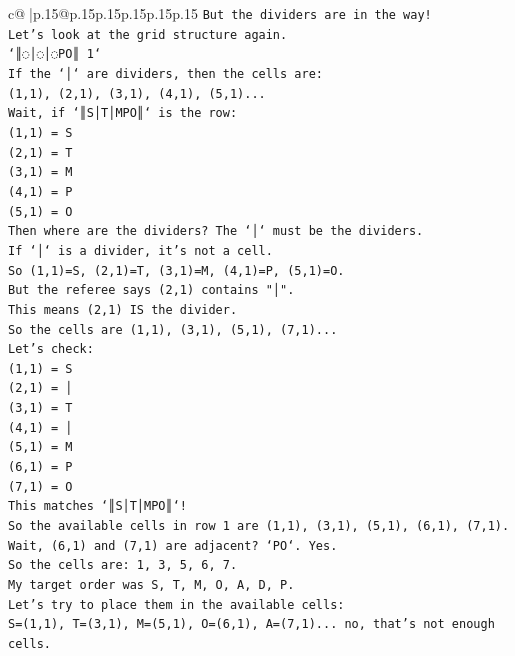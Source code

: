 \documentclass{article}
\begin{document}
{\begin{supertabular}{c@{$\;$}|p{.15\linewidth}@{}p{.15\linewidth}p{.15\linewidth}p{.15\linewidth}p{.15\linewidth}p{.15\linewidth}}
{{{\texttt{But the dividers are in the way!} \\
\texttt{Let's look at the grid structure again.} \\
\texttt{`║◌│◌│◌PO║ 1`} \\
\texttt{If the `│` are dividers, then the cells are:} \\
\texttt{(1,1), (2,1), (3,1), (4,1), (5,1)...} \\
\texttt{Wait, if `║S│T│MPO║` is the row:} \\
\texttt{(1,1) = S} \\
\texttt{(2,1) = T} \\
\texttt{(3,1) = M} \\
\texttt{(4,1) = P} \\
\texttt{(5,1) = O} \\
\texttt{Then where are the dividers? The `│` must be the dividers.} \\
\texttt{If `│` is a divider, it's not a cell.} \\
\texttt{So (1,1)=S, (2,1)=T, (3,1)=M, (4,1)=P, (5,1)=O.} \\
\texttt{But the referee says (2,1) contains "│".} \\
\texttt{This means (2,1) IS the divider.} \\
\texttt{So the cells are (1,1), (3,1), (5,1), (7,1)...} \\
\texttt{Let's check:} \\
\texttt{(1,1) = S} \\
\texttt{(2,1) = │} \\
\texttt{(3,1) = T} \\
\texttt{(4,1) = │} \\
\texttt{(5,1) = M} \\
\texttt{(6,1) = P} \\
\texttt{(7,1) = O} \\
\texttt{This matches `║S│T│MPO║`!} \\
\texttt{So the available cells in row 1 are (1,1), (3,1), (5,1), (6,1), (7,1).} \\
\texttt{Wait, (6,1) and (7,1) are adjacent? `PO`. Yes.} \\
\texttt{So the cells are: 1, 3, 5, 6, 7.} \\
\texttt{My target order was S, T, M, O, A, D, P.} \\
\texttt{Let's try to place them in the available cells:} \\
\texttt{S=(1,1), T=(3,1), M=(5,1), O=(6,1), A=(7,1)... no, that's not enough cells.} \\
}}}
\end{supertabular}}
\end{document}
